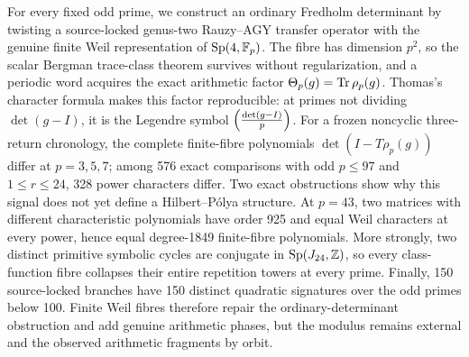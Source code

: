 For every fixed odd prime, we construct an ordinary Fredholm determinant by
twisting a source-locked genus-two Rauzy--AGY transfer operator with the
genuine finite Weil representation of \(\operatorname{Sp}(4,\mathbb{F}_p)\).  The fibre has
dimension \(p^2\), so the scalar Bergman trace-class theorem survives without
regularization, and a periodic word acquires the exact arithmetic factor
\(\Theta_p(g)=\operatorname{Tr}\rho_p(g)\).  Thomas's character formula makes this factor
reproducible: at primes not dividing \(\det(g-I)\), it is the Legendre symbol
\(\left(\frac{\det(g-I)}{p}\right)\).  For a frozen noncyclic three-return chronology, the
complete finite-fibre polynomials \(\det(I-T\rho_p(g))\) differ at
\(p=3,5,7\); among 576 exact comparisons with odd \(p\le97\) and
\(1\le r\le24\), 328 power characters differ.  Two exact obstructions show
why this signal does not yet define a Hilbert--P\'olya structure.  At
\(p=43\), two matrices with different characteristic polynomials have order
925 and equal Weil characters at every power, hence equal degree-1849
finite-fibre polynomials.  More strongly, two distinct primitive symbolic
cycles are conjugate in \(\operatorname{Sp}(J_{24},\mathbb{Z})\), so every class-function fibre collapses
their entire repetition towers at every prime.  Finally, 150 source-locked
branches have 150 distinct quadratic signatures over the odd primes below
100.  Finite Weil fibres therefore repair the ordinary-determinant
obstruction and add genuine arithmetic phases, but the modulus remains
external and the observed arithmetic fragments by orbit.
